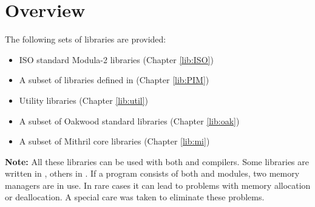 \chapter{Overview}\label{lib} 

The following sets of libraries are provided:
\begin{itemize}
\item         ISO standard Modula-2 libraries (Chapter \ref{lib:ISO})
\item         A subset of libraries defined in \cite{PIM} (Chapter \ref{lib:PIM})
\item         Utility libraries (Chapter \ref{lib:util})
\item         A subset of \ot{} Oakwood standard libraries (Chapter \ref{lib:oak})
\ifcomment
\item         A subset of Mithril core libraries (Chapter \ref{lib:mi})
\fi

\end{itemize}

{\bf Note:} All these libraries can be used with both \mt{} and \ot{}
compilers. Some libraries are written in \ot{}, others in \mt{}. If a
program consists of both \ot{} and \mt{} modules, two memory
managers are in use. In rare cases it can lead to problems with
memory allocation  or  deallocation.  A special care was taken to
eliminate these problems. %


